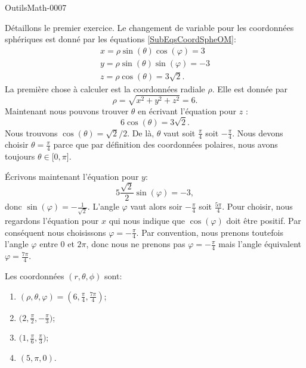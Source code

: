 
\begin{corrige}{OutilsMath-0007}

	Détaillons le premier exercice. Le changement de variable pour les coordonnées sphériques est donné par les équations \eqref{SubEqsCoordSpheOM}:
	\begin{subequations}
		\begin{align}
			x=\rho\sin(\theta)\cos(\varphi)=3\\
			y=\rho\sin(\theta)\sin(\varphi)=-3\\
			z=\rho\cos(\theta)=3\sqrt{2}.
		\end{align}
	\end{subequations}
	La première chose à calculer est la coordonnées radiale $\rho$. Elle est donnée par
	\begin{equation}
		\rho=\sqrt{x^2+y^2+z^2}=6.
	\end{equation}
	Maintenant nous pouvons trouver $\theta$ en écrivant l'équation pour $z$ :
	\begin{equation}
		6\cos(\theta)=3\sqrt{2}.
	\end{equation}
	Nous trouvons $\cos(\theta)=\sqrt{2}/2$. De là, $\theta$ vaut soit $\frac{ \pi }{ 4 }$ soit $-\frac{ \pi }{ 4 }$. Nous devons choisir $\theta=\frac{ \pi }{ 4 }$ parce que par définition des coordonnées polaires, nous avons toujours $\theta\in\mathopen[ 0 , \pi \mathclose]$.

	Écrivons maintenant l'équation pour $y$:
	\begin{equation}
		5\frac{ \sqrt{2} }{2}\sin(\varphi)=-3,
	\end{equation}
	donc $\sin(\varphi)=-\frac{1}{ \sqrt{2} }$. L'angle $\varphi$ vaut alors soir $-\frac{ \pi }{ 4 }$ soit $\frac{ 5\pi }{ 4 }$. Pour choisir, nous regardons l'équation pour $x$ qui nous indique que $\cos(\varphi)$ doit être positif. Par conséquent nous choisissons $\varphi=-\frac{ \pi }{ 4 }$. Par convention, nous prenons toutefois l'angle $\varphi$ entre $0$ et $2\pi$, donc nous ne prenons pas $\varphi=-\frac{ \pi }{ 4 }$ mais l'angle équivalent $\varphi=\frac{ 7\pi }{ 4 }$.

	Les coordonnées $(r,\theta,\phi)$ sont:
	\begin{enumerate}
		\item	
			$(\rho,\theta,\varphi)=(6,\frac{ \pi }{ 4 },\frac{ 7\pi }{ 4 })$;
		\item
			$\big( 2,\frac{ \pi }{2},-\frac{ \pi }{ 3 } \big)$;
		\item
			$\big( 1,\frac{ \pi }{ 6 },\frac{ \pi }{ 3 } \big)$;
		\item
			$(5,\pi,0)$.
	\end{enumerate}
	
\end{corrige}
